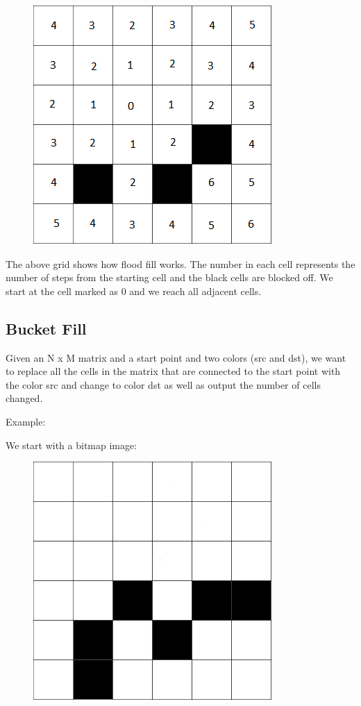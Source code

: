 \documentclass[11pt,oneside]{book}
\makeatletter
\def\maxwidth#1{\ifdim\Gin@nat@width>#1 #1\else\Gin@nat@width\fi}
\makeatother
\begin{document}
\vspace{5px}\begin{figure}[H]\centering
        \includegraphics[width=0.66\maxwidth{\textwidth}]{floodfill.png}
        \end{figure}

The above grid shows how flood fill works. The number in each cell represents the number of steps from the starting cell and the black cells are blocked off. We start at the cell marked as 0 and we reach all adjacent cells.

\subsection{Bucket Fill}

Given an N x M matrix and a start point and two colors (src and dst), we want to replace all the cells in the matrix that are connected to the start point with the color src and change to color dst as well as output the number of cells changed.

Example:

We start with a bitmap image:

\vspace{5px}\begin{figure}[H]\centering
        \includegraphics[width=0.66\maxwidth{\textwidth}]{bucket.png}
        \end{figure}
\end{document}
